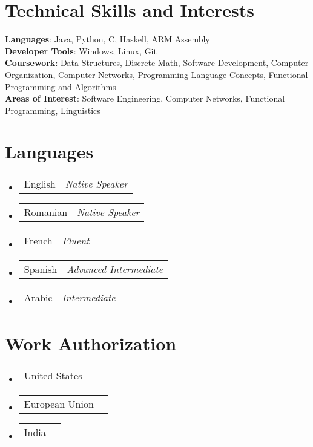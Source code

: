 \documentclass[a4paper,11pt]{article}
\makeatletter
\newcommand{\resumePOR}[3]{
\vspace{0.5mm}\item
    \begin{tabular*}{0.97\textwidth}[t]{l@{\extracolsep{\fill}}r}
        {#1}\hspace{0.3mm}#2 & \textit{\small{#3}} 
    \end{tabular*}
    \vspace{-2mm}
}
\newcommand{\resumeSubHeadingListStart}{\begin{itemize}[leftmargin=*,labelsep=0mm]}
\newcommand{\resumeSubHeadingListEnd}{\end{itemize}\vspace{2mm}}
\makeatother
\begin{document}
\section{\textbf{Technical Skills and Interests}}
 \begin{itemize}[leftmargin=0.05in, label={}]
    \small{\item{
     \textbf{Languages}{: Java, Python, C, Haskell, ARM Assembly } \\
       \textbf{Developer Tools}{: Windows, Linux, Git } \\

     \textbf{Coursework}{: Data Structures, Discrete Math, Software Development, Computer Organization, Computer Networks, Programming Language Concepts, Functional Programming and Algorithms} \\

     \textbf{Areas of Interest}{: Software Engineering, Computer Networks, Functional Programming, Linguistics } \\
    }}
 \end{itemize}
 \vspace{-16pt}



\section{\textbf{Languages}}
\vspace{-0.4mm}
\resumeSubHeadingListStart
\resumePOR{English} %
    {} %
    {Native Speaker} %
\resumePOR{Romanian } %
    {} %
    {Native Speaker} %
\resumePOR{French } %
    {} %
    {Fluent} %
\resumePOR{Spanish } %
    {} %
    {Advanced Intermediate} %
\resumePOR{Arabic } %
    {} %
    {Intermediate} %
\resumeSubHeadingListEnd
\vspace{-5mm}




\section{\textbf{Work Authorization}}
\vspace{-0.4mm}
\resumeSubHeadingListStart
\resumePOR{United States } %
    {} %
    {} %
    
\resumePOR{European Union } %
    {} %
    {} %
\resumePOR{India } %
    {} %
    {} %
\resumeSubHeadingListEnd
\vspace{-5mm}



\end{document}
